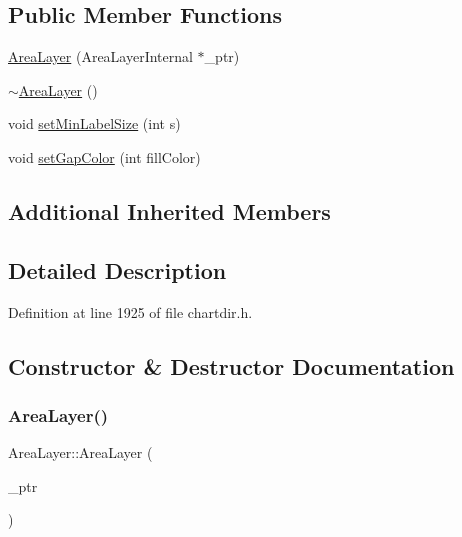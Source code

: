 \subsection*{Public Member Functions}
\begin{DoxyCompactItemize}
\item 
\hyperlink{class_area_layer_a344068141673f8eb209a6bccf946539b}{Area\+Layer} (Area\+Layer\+Internal $\ast$\+\_\+ptr)
\item 
\hyperlink{class_area_layer_ac7ee192b99d13cdaead0010e9cc99a74}{$\sim$\+Area\+Layer} ()
\item 
void \hyperlink{class_area_layer_a5db68f656bcb69c9064e4553de75f0f7}{set\+Min\+Label\+Size} (int s)
\item 
void \hyperlink{class_area_layer_a2bb65eb13524a34d5ab090b48bde062b}{set\+Gap\+Color} (int fill\+Color)
\end{DoxyCompactItemize}
\subsection*{Additional Inherited Members}


\subsection{Detailed Description}


Definition at line 1925 of file chartdir.\+h.



\subsection{Constructor \& Destructor Documentation}
\mbox{\label{class_area_layer_a344068141673f8eb209a6bccf946539b}} 
\subsubsection{\texorpdfstring{Area\+Layer()}{AreaLayer()}}
{\footnotesize\ttfamily Area\+Layer\+::\+Area\+Layer (\begin{DoxyParamCaption}\item[{Area\+Layer\+Internal $\ast$}]{\+\_\+ptr }\end{DoxyParamCaption})\hspace{0.3cm}{\ttfamily [inline]}}



